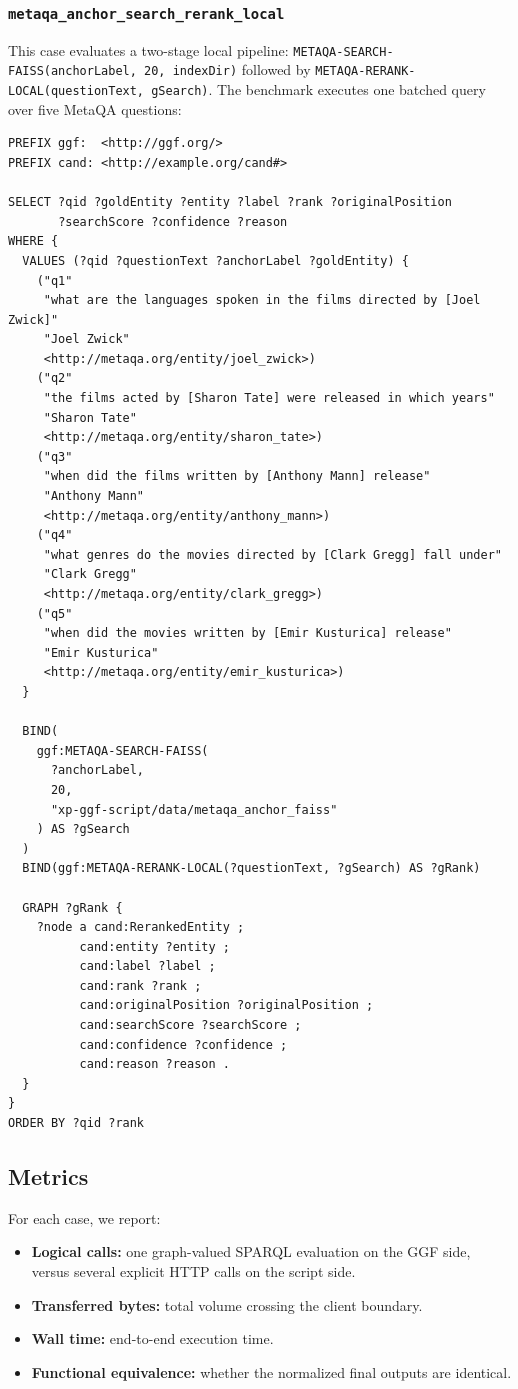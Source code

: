 \subsubsection*{\texttt{metaqa\_anchor\_search\_rerank\_local}}

This case evaluates a two-stage local pipeline:
\texttt{METAQA-SEARCH-FAISS(anchorLabel, 20, indexDir)} followed by
\texttt{METAQA-RERANK-LOCAL(questionText, gSearch)}. The benchmark executes one
batched query over five MetaQA questions:

\begin{verbatim}
PREFIX ggf:  <http://ggf.org/>
PREFIX cand: <http://example.org/cand#>

SELECT ?qid ?goldEntity ?entity ?label ?rank ?originalPosition
       ?searchScore ?confidence ?reason
WHERE {
  VALUES (?qid ?questionText ?anchorLabel ?goldEntity) {
    ("q1"
     "what are the languages spoken in the films directed by [Joel Zwick]"
     "Joel Zwick"
     <http://metaqa.org/entity/joel_zwick>)
    ("q2"
     "the films acted by [Sharon Tate] were released in which years"
     "Sharon Tate"
     <http://metaqa.org/entity/sharon_tate>)
    ("q3"
     "when did the films written by [Anthony Mann] release"
     "Anthony Mann"
     <http://metaqa.org/entity/anthony_mann>)
    ("q4"
     "what genres do the movies directed by [Clark Gregg] fall under"
     "Clark Gregg"
     <http://metaqa.org/entity/clark_gregg>)
    ("q5"
     "when did the movies written by [Emir Kusturica] release"
     "Emir Kusturica"
     <http://metaqa.org/entity/emir_kusturica>)
  }

  BIND(
    ggf:METAQA-SEARCH-FAISS(
      ?anchorLabel,
      20,
      "xp-ggf-script/data/metaqa_anchor_faiss"
    ) AS ?gSearch
  )
  BIND(ggf:METAQA-RERANK-LOCAL(?questionText, ?gSearch) AS ?gRank)

  GRAPH ?gRank {
    ?node a cand:RerankedEntity ;
          cand:entity ?entity ;
          cand:label ?label ;
          cand:rank ?rank ;
          cand:originalPosition ?originalPosition ;
          cand:searchScore ?searchScore ;
          cand:confidence ?confidence ;
          cand:reason ?reason .
  }
}
ORDER BY ?qid ?rank
\end{verbatim}

\subsection{Metrics}
\label{subsec:metrics}

For each case, we report:
\begin{itemize}
\item \textbf{Logical calls:} one graph-valued SPARQL evaluation on the GGF
side, versus several explicit HTTP calls on the script side.
\item \textbf{Transferred bytes:} total volume crossing the client boundary.
\item \textbf{Wall time:} end-to-end execution time.
\item \textbf{Functional equivalence:} whether the normalized final outputs are
identical.
\end{itemize}

